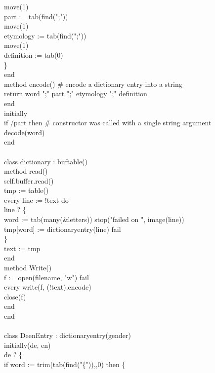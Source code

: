 {\>\>\>move(1) \\
\>\>\>part := tab(find(";")) \\
\>\>\>move(1) \\
\>\>\>etymology := tab(find(";")) \\
\>\>\>move(1) \\
\>\>\>definition := tab(0) \\
\>\>\>\} \\
\>end \\
\>method encode() \# encode a dictionary entry into a string \\
\>\>return word {\textbar}{\textbar} ";" {\textbar}{\textbar} part {\textbar}{\textbar}
";" {\textbar}{\textbar} etymology {\textbar}{\textbar} ";" {\textbar}{\textbar} definition \\
\>end \\
initially \\
\>if /part then \# constructor was called with a single string argument \\
\>\>decode(word) \\
end \\
\ \\
class dictionary : buftable() \\
\>method read() \\
\>\>self.buffer.read() \\
\>\>tmp := table() \\
\>\>every line := !text do \\
\>\>\>line ? \{ \\
\>\>\>\>word := tab(many(\&letters)) {\textbar} stop("failed on ", image(line)) \\
\>\>\>\>tmp[word] := dictionaryentry(line) {\textbar} fail \\
\>\>\>\>\} \\
\>\>text := tmp \\
\>end \\
\>method Write() \\
\>\>f := open(filename, "w") {\textbar} fail \\
\>\>every write(f, (!text).encode) \\
\>\>close(f) \\
\>end \\
end \\
\ \\
class DeenEntry : dictionaryentry(gender) \\
initially(de, en) \\
\>de ? \{ \\
\>\>if word := trim(tab(find("\{")),,0) then \{ \\
}
